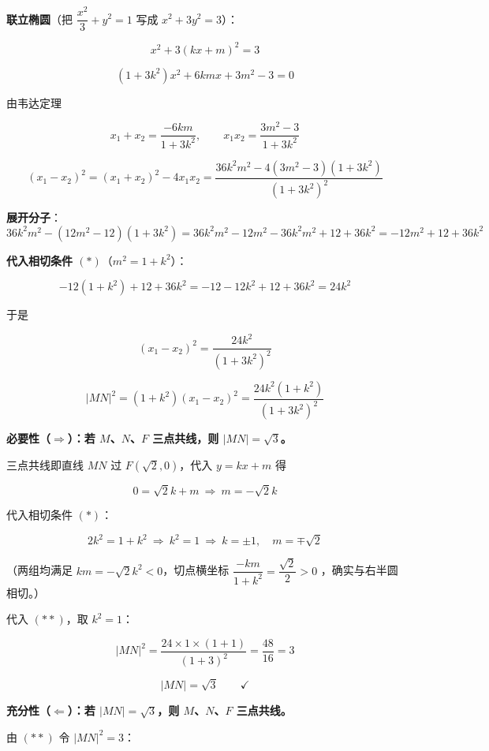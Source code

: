 \textbf{联立椭圆}（把 $\dfrac{x^{2}}3+y^{2}=1$ 写成 $x^{2}+3y^{2}=3$）：

\[x^{2}+3(kx+m)^{2}=3\]

\[\left(1+3k^{2}\right)x^{2}+6kmx+3m^{2}-3=0\]

由韦达定理

\[x_1+x_2=\frac{-6km}{1+3k^{2}},\qquad x_1x_2=\frac{3m^{2}-3}{1+3k^{2}}\]

\[\left(x_1-x_2\right)^{2}=\left(x_1+x_2\right)^{2}-4x_1x_2=\frac{36k^{2}m^{2}-4\left(3m^{2}-3\right)\left(1+3k^{2}\right)}{\left(1+3k^{2}\right)^{2}}\]

\textbf{展开分子}：
\[36k^{2}m^{2}-\left(12m^{2}-12\right)\left(1+3k^{2}\right)=36k^{2}m^{2}-12m^{2}-36k^{2}m^{2}+12+36k^{2}=-12m^{2}+12+36k^{2}\]

\textbf{代入相切条件 $(\ast)$}（$m^{2}=1+k^{2}$）：

\[-12\left(1+k^{2}\right)+12+36k^{2}=-12-12k^{2}+12+36k^{2}=24k^{2}\]

于是

\[\left(x_1-x_2\right)^{2}=\frac{24k^{2}}{\left(1+3k^{2}\right)^{2}}\]

\[|MN|^{2}=\left(1+k^{2}\right)\left(x_1-x_2\right)^{2}=\frac{24k^{2}\left(1+k^{2}\right)}{\left(1+3k^{2}\right)^{2}}\tag{$\ast\ast$}\]

\par\medskip

\textbf{必要性（$\Longrightarrow$）：若 $M$、$N$、$F$ 三点共线，则 $|MN|=\sqrt3$。}

三点共线即直线 $MN$ 过 $F\left(\sqrt2,0\right)$，代入 $y=kx+m$ 得

\[0=\sqrt2k+m\ \Longrightarrow\ m=-\sqrt2k\]

代入相切条件 $(\ast)$：

\[2k^{2}=1+k^{2}\ \Longrightarrow\ k^{2}=1\ \Longrightarrow\ k=\pm1,\quad m=\mp\sqrt2\]

（两组均满足 $km=-\sqrt2k^{2}<0$，切点横坐标 $\dfrac{-km}{1+k^{2}}=\dfrac{\sqrt2}2>0$ ，确实与右半圆相切。）

代入 $(\ast\ast)$，取 $k^{2}=1$：

\[|MN|^{2}=\frac{24\times1\times(1+1)}{(1+3)^{2}}=\frac{48}{16}=3\]

\[|MN|=\sqrt3\qquad\checkmark\]

\par\medskip

\textbf{充分性（$\Longleftarrow$）：若 $|MN|=\sqrt3$，则 $M$、$N$、$F$ 三点共线。}

由 $(\ast\ast)$ 令 $|MN|^{2}=3$：

